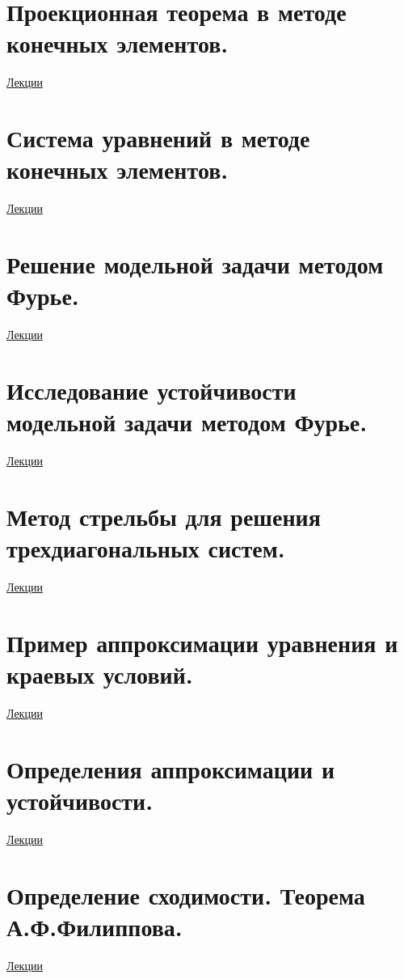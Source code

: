 \documentclass[specialist, subf, href, colorlinks=true, 12pt, times, mtpro, final]{disser}
\theoremstyle{definition}
\begin{document}
\section {Проекционная теорема в методе конечных элементов.}
	\hyperlink {lects.103}{Лекции}\\

\section {Система уравнений в методе конечных элементов.}
	\hyperlink {lects.106}{Лекции}\\

\section {Решение модельной задачи методом Фурье.}
	\hyperlink {lects.108}{Лекции}\\

\section {Исследование устойчивости модельной задачи методом Фурье.}
	\hyperlink {lects.111}{Лекции}\\

\section {Метод стрельбы для решения трехдиагональных систем.}
	\hyperlink {lects.112}{Лекции}\\

\section {Пример аппроксимации уравнения и краевых условий.}
	\hyperlink {lects.115}{Лекции}\\

\section {Определения аппроксимации и устойчивости.}
	\hyperlink {lects.118}{Лекции}\\

\section {Определение сходимости. Теорема А.Ф.Филиппова.}
	\hyperlink {lects.120}{Лекции}\\
\end{document}
